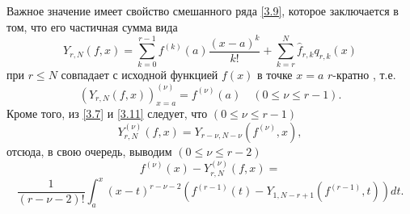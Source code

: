 Важное значение имеет свойство  смешанного ряда \eqref{3.9}, которое заключается в том, что его частичная сумма вида
\begin{equation}\label{3.11}
Y_{r,N}(f,x)=\sum_{k=0}^{r-1} f^{(k)}(a)\frac{(x-a)^k}{k!}+ \sum_{k=r}^{N} \hat f_{r,k}q_{r,k}(x)
\end{equation}
 при   $r\le N$  совпадает с исходной функцией $f(x)$   в точке $x=a$ $r$-кратно , т.е.
\begin{equation}\label{3.12}
(Y_{r,N}(f,x))^{(\nu)}_{x=a}=f^{(\nu)}(a)\quad (0\le\nu\le r-1).
\end{equation}
Кроме того, из \eqref{3.7} и \eqref{3.11} следует, что $(0\le\nu\le r-1)$
\begin{equation}\label{3.13}
 Y_{r,N}^{(\nu)}(f,x)=Y_{r-\nu,N-\nu}(f^{(\nu)},x),
 \end{equation}
отсюда, в свою очередь, выводим $(0\le\nu\le r-2)$
 $$
f^{(\nu)}(x)-Y_{r,N}^{(\nu)}(f,x)=
$$
  \begin{equation}\label{3.14}
\frac{1}{(r-\nu-2)!}\int_a^x (x-t)^{r-\nu-2}(f^{(r-1)}(t)-Y_{1,N-r+1}(f^{(r-1)},t))dt.
 \end{equation}

